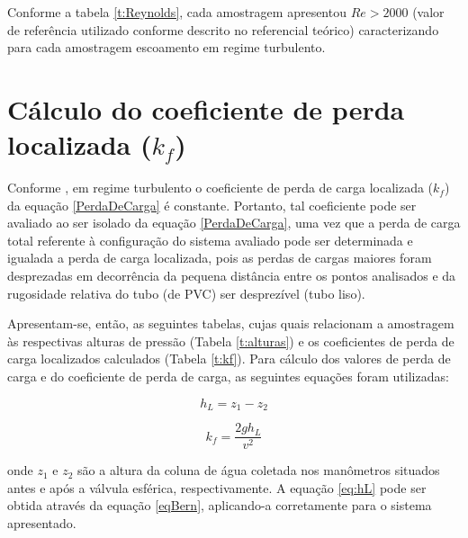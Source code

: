 Conforme a tabela \ref{t:Reynolds}, cada amostragem apresentou $Re > 2000$ (valor
de referência utilizado conforme descrito no referencial teórico) caracterizando
para cada amostragem escoamento em regime turbulento.

\section{Cálculo do coeficiente de perda localizada ($k_f$)}
\label{sec:carga}

Conforme , em regime turbulento o coeficiente de perda de
carga localizada ($k_f$) da equação \eqref{PerdaDeCarga} é constante. Portanto,
tal coeficiente pode ser avaliado ao ser isolado da equação
\eqref{PerdaDeCarga}, uma vez que a perda de carga total referente à
configuração do sistema avaliado pode ser determinada e igualada a perda de
carga localizada, pois as perdas de cargas maiores foram desprezadas em
decorrência da pequena distância entre os pontos analisados e da rugosidade
relativa do tubo (de PVC) ser desprezível (tubo liso).

Apresentam-se, então, as seguintes tabelas, cujas quais relacionam a amostragem
às respectivas alturas de pressão (Tabela \ref{t:alturas}) e os coeficientes
de perda de carga localizados calculados (Tabela \ref{t:kf}). Para cálculo dos
valores de perda de carga e do coeficiente de perda de carga, as seguintes
equações foram utilizadas:

\begin{equation}\label{eq:hL}
h_L = z_1 - z_2
\end{equation}

\begin{equation}\label{eq:kf}
  k_f = \frac{2 g h_L}{v^2}
\end{equation}

onde $z_1$ e $z_2$ são a altura da coluna de água coletada nos manômetros
situados antes e após a válvula esférica, respectivamente. A equação
\eqref{eq:hL} pode ser obtida através da equação \eqref{eqBern}, aplicando-a
corretamente para o sistema apresentado.

